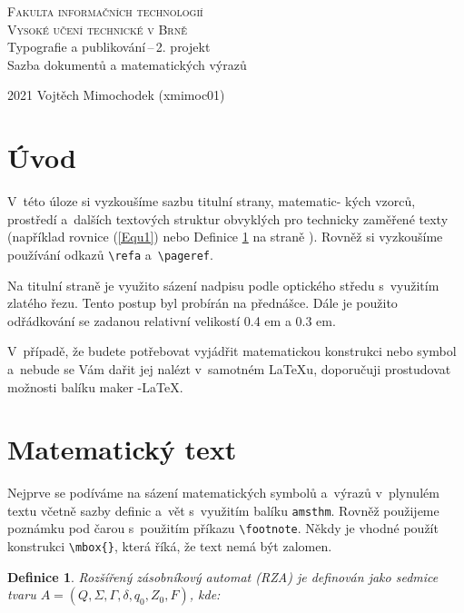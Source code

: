 \documentclass[a4paper, 11pt, twocolumn]{article}
\date{}
\newtheorem{definition}{Definice}
\begin{document}
\begin{titlepage}
\begin{center}
{\Huge
\textsc{Fakulta informačních technologií\\[0.4em]Vysoké učení technické v Brně}}\\
{\Large
Typografie a publikování\,--\,2. projekt\\[0.3em]
Sazba dokumentů a matematických výrazů
}
\end{center}

{\Large 2021 \hfill Vojtěch Mimochodek (xmimoc01)}
\end{titlepage}

\section*{Úvod}
V~této úloze si vyzkoušíme sazbu titulní strany, matematic- kých vzorců, prostředí a~dalších textových struktur obvyklých pro technicky zaměřené texty (například rovnice (\ref{Equ1}) nebo Definice \ref{Def1} na straně \pageref{Def1}). Rovněž si vyzkoušíme používání odkazů \verb|\refa| a~\verb|\pageref|. 

Na titulní straně je využito sázení nadpisu podle optického středu s~využitím zlatého řezu. Tento postup byl probírán na přednášce. Dále je použito odřádkování se zadanou relativní velikostí 0.4 em a 0.3 em. 

V~případě, že budete potřebovat vyjádřit matematickou konstrukci nebo symbol a~nebude se Vám dařit jej nalézt v~samotném {\LaTeX}u, doporučuji prostudovat možnosti balíku maker {\AmS}-{\LaTeX}.

\section{Matematický text}
Nejprve se podíváme na sázení matematických symbolů a~výrazů v~plynulém textu včetně sazby definic a~vět s~využitím balíku \texttt{amsthm}. Rovněž použijeme poznámku pod čarou s~použitím příkazu \verb|\footnote|. Někdy je vhodné použít konstrukci \verb|\mbox{}|, která říká, že text nemá být zalomen.

\begin{definition}\label{Def1}
\textnormal{Rozšířený zásobníkový automat} (RZA) je definován jako sedmice tvaru $A = (Q, \Sigma, \Gamma, \delta, q_0, Z_0, F)$, kde:
\end{definition}
\end{document}
